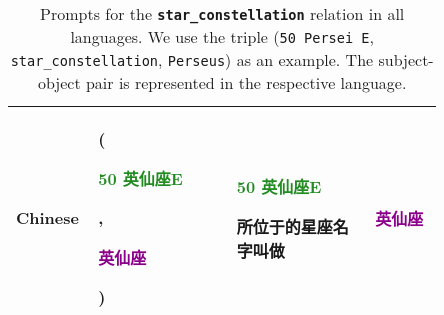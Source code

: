 \begin{table*}[htbp]
\begin{center}
\begin{tabular}{m{0.10\linewidth} p{0.30\linewidth} p{0.30\linewidth} m{0.15\linewidth}}
\midrule
{\centering Chinese} 
    & {\raggedright (\textcolor{forestgreen}{\begin{CJK}{UTF8}{gbsn}50 英仙座E\end{CJK}}, \textcolor{darkmagenta}{\begin{CJK}{UTF8}{gbsn}英仙座\end{CJK}})}
    & \textcolor{forestgreen}{\begin{CJK}{UTF8}{gbsn}50 英仙座E\end{CJK}}\begin{CJK}{UTF8}{gbsn}所位于的星座名字叫做\end{CJK}
    & {\centering \textcolor{darkmagenta}{\begin{CJK}{UTF8}{gbsn}英仙座\end{CJK}}} \\
\bottomrule
\end{tabular}
\end{center}
\caption{Prompts for the \textbf{\texttt{star\_constellation}} relation in all languages. We use the triple (\texttt{50 Persei E}, \texttt{star\_constellation}, \texttt{Perseus}) as an example. The subject-object pair is represented in the respective language.}
\label{tab:prompts_star_constellation}
\end{table*}
